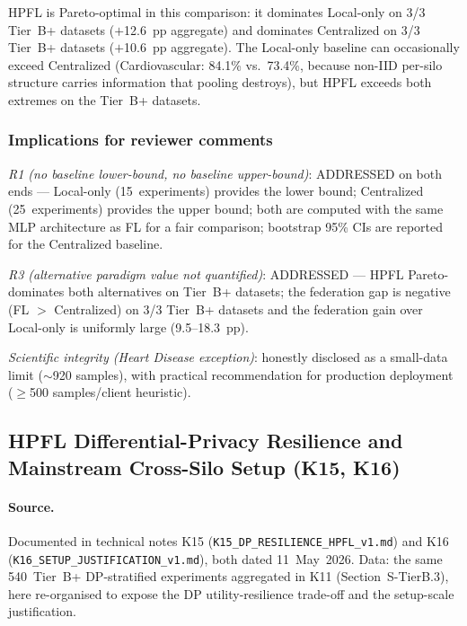 \documentclass[conference]{IEEEtran}
\begin{document}
\noindent HPFL is Pareto-optimal in this comparison: it dominates Local-only on 3/3 Tier~B+ datasets ($+$12.6~pp aggregate) and dominates Centralized on 3/3 Tier~B+ datasets ($+$10.6~pp aggregate). The Local-only baseline can occasionally exceed Centralized (Cardiovascular: 84.1\% vs.\ 73.4\%, because non-IID per-silo structure carries information that pooling destroys), but HPFL exceeds both extremes on the Tier~B+ datasets.

\subsubsection*{Implications for reviewer comments}

\emph{R1 (no baseline lower-bound, no baseline upper-bound)}: ADDRESSED on both ends --- Local-only (15~experiments) provides the lower bound; Centralized (25~experiments) provides the upper bound; both are computed with the same MLP architecture as FL for a fair comparison; bootstrap 95\% CIs are reported for the Centralized baseline.

\emph{R3 (alternative paradigm value not quantified)}: ADDRESSED --- HPFL Pareto-dominates both alternatives on Tier~B+ datasets; the federation gap is negative (FL $>$ Centralized) on 3/3 Tier~B+ datasets and the federation gain over Local-only is uniformly large (9.5--18.3~pp).

\emph{Scientific integrity (Heart Disease exception)}: honestly disclosed as a small-data limit ($\sim$920 samples), with practical recommendation for production deployment ($\geq$500 samples/client heuristic).

\subsection{HPFL Differential-Privacy Resilience and Mainstream Cross-Silo Setup (K15, K16)}
\label{sec:tier_b_dp_setup}

\paragraph{Source.} Documented in technical notes K15 (\texttt{K15\_DP\_RESILIENCE\_HPFL\_v1.md}) and K16 (\texttt{K16\_SETUP\_JUSTIFICATION\_v1.md}), both dated 11~May~2026. Data: the same 540~Tier~B+ DP-stratified experiments aggregated in K11 (Section~S-TierB.3), here re-organised to expose the DP utility-resilience trade-off and the setup-scale justification.
\end{document}
